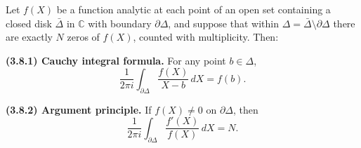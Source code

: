Let $f(X)$ be a function analytic at each point of an open set containing a closed disk $\bar{\Delta}$ in $\mathbb{C}$ with boundary $\partial \Delta$, and suppose that within $\Delta = \bar{\Delta} \setminus \partial \Delta$ there are exactly $N$ zeros of $f(X)$, counted with multiplicity. Then:

\textbf{(3.8.1) Cauchy integral formula.}
For any point $b \in \Delta$,
$$\frac{1}{2\pi i} \int_{\partial \Delta} \frac{f(X)}{X - b} \, dX = f(b).$$

\textbf{(3.8.2) Argument principle.}
If $f(X) \neq 0$ on $\partial \Delta$, then
$$\frac{1}{2\pi i} \int_{\partial \Delta} \frac{f'(X)}{f(X)} \, dX = N.$$